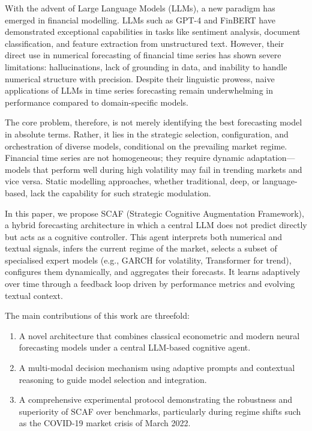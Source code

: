 \documentclass[conference]{IEEEtran}
\begin{document}
With the advent of Large Language Models (LLMs), a new paradigm has emerged in financial modelling. LLMs such as GPT-4 and FinBERT have demonstrated exceptional capabilities in tasks like sentiment analysis, document classification, and feature extraction from unstructured text. However, their direct use in numerical forecasting of financial time series has shown severe limitations: hallucinations, lack of grounding in data, and inability to handle numerical structure with precision. Despite their linguistic prowess, naive applications of LLMs in time series forecasting remain underwhelming in performance compared to domain-specific models.

The core problem, therefore, is not merely identifying the best forecasting model in absolute terms. Rather, it lies in the strategic selection, configuration, and orchestration of diverse models, conditional on the prevailing market regime. Financial time series are not homogeneous; they require dynamic adaptation—models that perform well during high volatility may fail in trending markets and vice versa. Static modelling approaches, whether traditional, deep, or language-based, lack the capability for such strategic modulation.

In this paper, we propose SCAF (Strategic Cognitive Augmentation Framework), a hybrid forecasting architecture in which a central LLM does not predict directly but acts as a cognitive controller. This agent interprets both numerical and textual signals, infers the current regime of the market, selects a subset of specialised expert models (e.g., GARCH for volatility, Transformer for trend), configures them dynamically, and aggregates their forecasts. It learns adaptively over time through a feedback loop driven by performance metrics and evolving textual context.

The main contributions of this work are threefold:
\begin{enumerate}
    \item A novel architecture that combines classical econometric and modern neural forecasting models under a central LLM-based cognitive agent.
    \item A multi-modal decision mechanism using adaptive prompts and contextual reasoning to guide model selection and integration.
    \item A comprehensive experimental protocol demonstrating the robustness and superiority of SCAF over benchmarks, particularly during regime shifts such as the COVID-19 market crisis of March 2022.
\end{enumerate}
\end{document}
